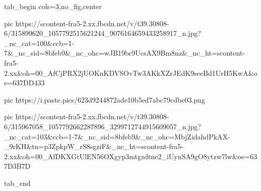  
 
 
 
 

\ifcmt
  tab_begin cols=3,no_fig,center

     pic https://scontent-fra5-2.xx.fbcdn.net/v/t39.30808-6/315899620_1057792515621244_9076164659433258917_n.jpg?_nc_cat=100&ccb=1-7&_nc_sid=8bfeb9&_nc_ohc=wJB19br9UcsAX9Bm8nz&_nc_ht=scontent-fra5-2.xx&oh=00_AfCjPRX2jUOKnKDVSOvTw3AKkXZrJEdK9seeBd1UrH5KwA&oe=637DD433

     pic https://i.paste.pics/623d9244872ade10b5ed7abc79cdbe03.png

     pic https://scontent-fra5-2.xx.fbcdn.net/v/t39.30808-6/315967058_1057792662287896_3299712744915609057_n.jpg?_nc_cat=103&ccb=1-7&_nc_sid=8bfeb9&_nc_ohc=MbjZidahdPkAX-_9rKH&tn=p3ZpkpW_rS8sgziF&_nc_ht=scontent-fra5-2.xx&oh=00_AfDKXGtUlEN56OXgyp3mtgzdtne2_iUynSA9gO8ytzw7lw&oe=637D3B7D

  tab_end
\fi
